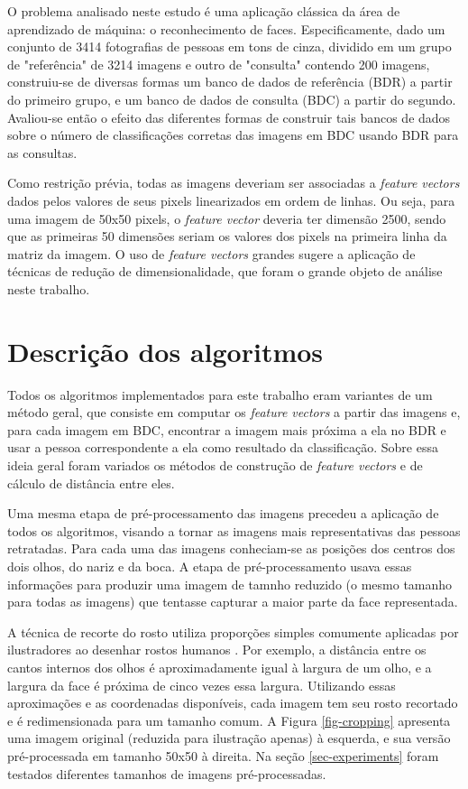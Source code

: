 \documentclass[10pt,twocolumn,letterpaper]{article}
\begin{document}
O problema analisado neste estudo é uma aplicação clássica da área de aprendizado de máquina: o reconhecimento de faces. Especificamente, dado um conjunto de 3414 fotografias de pessoas em tons de cinza, dividido em um grupo de "referência" de 3214 imagens e outro de "consulta" contendo 200 imagens, construiu-se de diversas formas um banco de dados de referência (BDR) a partir do primeiro grupo, e um banco de dados de consulta (BDC) a partir do segundo. Avaliou-se então o efeito das diferentes formas de construir tais bancos de dados sobre o número de classificações corretas das imagens em BDC usando BDR para as consultas.

Como restrição prévia, todas as imagens deveriam ser associadas a \emph{feature vectors} dados pelos valores de seus pixels linearizados em ordem de linhas. Ou seja, para uma imagem de 50x50 pixels, o \emph{feature vector} deveria ter dimensão 2500, sendo que as primeiras 50 dimensões seriam os valores dos pixels na primeira linha da matriz da imagem. O uso de \emph{feature vectors} grandes sugere a aplicação de técnicas de redução de dimensionalidade, que foram o grande objeto de análise neste trabalho.

\section{Descrição dos algoritmos}
\label{sec-algorithm}

Todos os algoritmos implementados para este trabalho eram variantes de um método geral, que consiste em computar os \emph{feature vectors} a partir das imagens e, para cada imagem em BDC, encontrar a imagem mais próxima a ela no BDR e usar a pessoa correspondente a ela como resultado da classificação. Sobre essa ideia geral foram variados os métodos de construção de \emph{feature vectors} e de cálculo de distância entre eles.

Uma mesma etapa de pré-processamento das imagens precedeu a aplicação de todos os algoritmos, visando a tornar as imagens mais representativas das pessoas retratadas. Para cada uma das imagens conheciam-se as posições dos centros dos dois olhos, do nariz e da boca. A etapa de pré-processamento usava essas informações para produzir uma imagem de tamnho reduzido (o mesmo tamanho para todas as imagens) que tentasse capturar a maior parte da face representada.

A técnica de recorte do rosto utiliza proporções simples comumente aplicadas por ilustradores ao desenhar rostos humanos \cite{FacialProportions:2010:Online}. Por exemplo, a distância entre os cantos internos dos olhos é aproximadamente igual à largura de um olho, e a largura da face é próxima de cinco vezes essa largura. Utilizando essas aproximações e as coordenadas disponíveis, cada imagem tem seu rosto recortado e é redimensionada para um tamanho comum. A Figura \ref{fig-cropping} apresenta uma imagem original (reduzida para ilustração apenas) à esquerda, e sua versão pré-processada em tamanho 50x50 à direita. Na seção \ref{sec-experiments} foram testados diferentes tamanhos de imagens pré-processadas.
\end{document}
